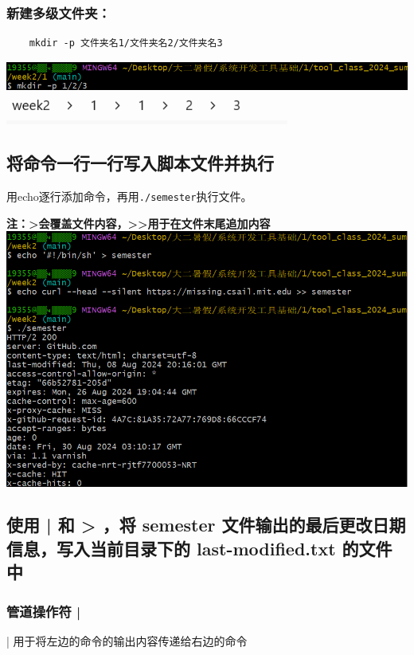 \documentclass[UTF8,a4paper]{ctexart}
\begin{document}
\subsubsection{新建多级文件夹：}
\begin{lstlisting}
    mkdir -p 文件夹名1/文件夹名2/文件夹名3
\end{lstlisting}
\includegraphics[width=1\textwidth]{./pictures/多级.png}\\
\includegraphics[width=0.7\textwidth]{./pictures/多级2.png}

\subsection{将命令一行一行写入脚本文件并执行}
用echo逐行添加命令，再用\verb|./semester|执行文件。\par
\textbf{注：>会覆盖文件内容，>>用于在文件末尾追加内容}\\
\includegraphics[width=1\textwidth]{./pictures/3.png}

\subsection{使用 | 和 > ，将 semester 文件输出的最后更改日期信息，写入当前目录下的 last-modified.txt 的文件中}
\subsubsection{管道操作符 |}
| 用于将左边的命令的输出内容传递给右边的命令
\end{document}
